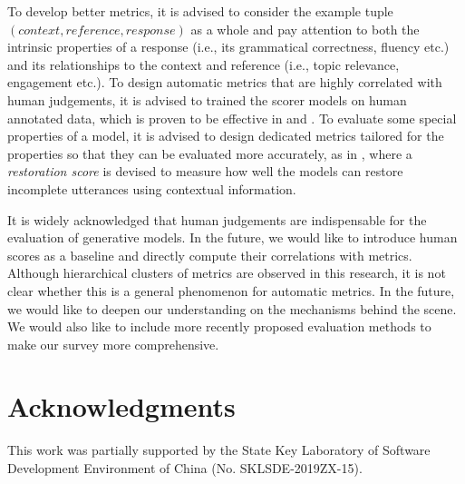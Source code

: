 \documentclass[conference]{IEEEtran}
\begin{document}
To develop better metrics, it is advised to consider the example tuple $(context, reference, response)$
as a whole and pay attention to both the intrinsic properties of a response (i.e., its grammatical correctness, fluency etc.) and its relationships to the context and reference (i.e., topic relevance, engagement etc.).
To design automatic metrics that are highly correlated with human judgements,
it is advised to trained the scorer models on human annotated data, which is proven to be effective in \cite{ADEM} and \cite{TowardsAMetric}.
To evaluate some special properties of a model,
it is advised to design dedicated metrics tailored for the properties so that they can be evaluated more accurately, as in \cite{IncompleteUtterance}, where a \emph{restoration score} is devised to measure how well the models can restore incomplete utterances using contextual information.

It is widely acknowledged that human judgements are indispensable for the evaluation of generative models.
In the future, we would like to introduce human scores as a baseline and directly compute their correlations with metrics.
Although hierarchical clusters of metrics are observed in this research, it is not clear whether this is a general phenomenon for automatic metrics.
In the future, we would like to deepen our understanding on the mechanisms behind the scene.
We would also like to include more recently proposed evaluation methods to make our survey more comprehensive.

\section*{Acknowledgments}
This work was partially supported by the State Key Laboratory of Software Development Environment of China (No. SKLSDE-2019ZX-15).



%
%
%
\balance




\end{document}
